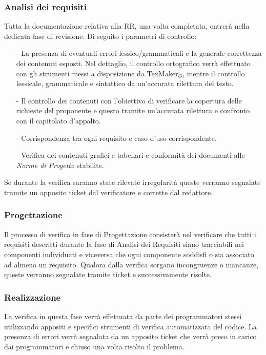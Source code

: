 \subsubsection{Analisi dei requisiti}
Tutta la documentazione relativa alla RR, una volta completata, entrerà nella dedicata fase di revisione. Di seguito i parametri di controllo:
\begin{itemize}
	\item[-] La presenza di eventuali errori lessico/grammaticali e la generale correttezza dei contenuti esposti. Nel dettaglio, il controllo ortografico verrà effettuato con gli strumenti messi a disposizione da TexMaker$_G$, mentre il controllo lessicale, grammaticale e sintattico da un'accurata rilettura del testo.
	\item[-]Il controllo dei contenuti con l'obiettivo di verificare la copertura delle richieste del proponente e questo tramite un'accurata rilettura e confronto con il capitolato d'appalto.
	\item[-]Corrispondenza tra ogni requisito e caso d'uso corrispondente.
	\item[-]Verifica dei contenuti grafici e tabellari e conformità dei documenti alle \textit{Norme di Progetto} stabilite.
\end{itemize}
Se durante la verifica saranno state rilevate irregolarità
queste verranno segnalate tramite un apposito ticket dal verificatore
e corrette dal redattore.

\subsubsection{Progettazione}
Il processo di verifica in fase di Progettazione consisterà nel verificare che tutti i requisiti descritti durante la fase di Analisi dei Requisiti siano tracciabili nei componenti individuati e viceversa che ogni componente soddisfi o sia associato ad almeno un requisito. Qualora dalla verifica sorgano incongruenze o mancanze, queste verranno segnalate tramite ticket e successivamente risolte.

\subsubsection{Realizzazione}
La verifica in questa fase verrà effettuata da parte
dei programmatori stessi utilizzando appositi e specifici strumenti di
verifica automatizzata del codice. La presenza di errori verrà segnalata da
un apposito ticket che verrà preso in carico dai programmatori e chiuso
una volta risolto il problema.

